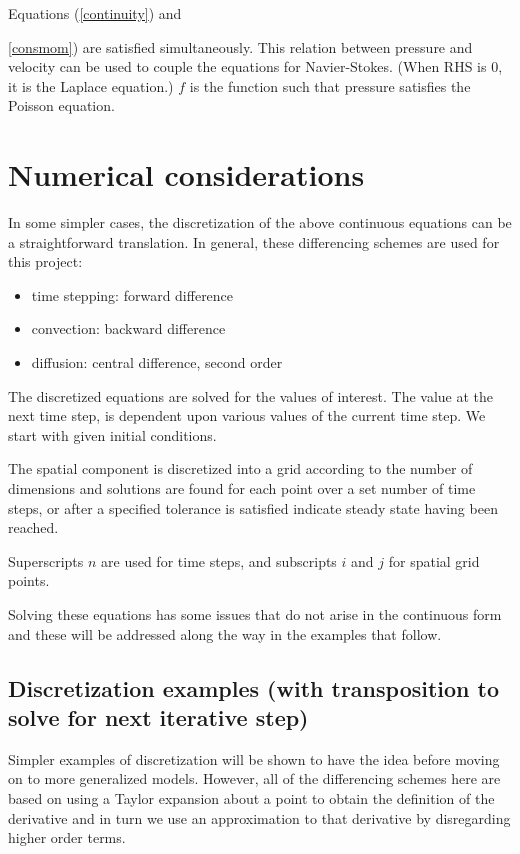 \documentclass[11pt]{article}
\begin{document}
Equations (\ref{continuity}) and {\ref{consmom}) are satisfied simultaneously.
This relation between pressure and velocity can be used to couple the equations
for Navier-Stokes. (When RHS is 0, it is the Laplace equation.) $f$ is the
function such that pressure satisfies the Poisson equation.


\section{Numerical considerations}

In some simpler cases, the discretization of the above continuous equations can
be a straightforward translation. In general, these differencing schemes are used
for this project:

\begin{itemize}
\item time stepping: forward difference
\item convection: backward difference
\item diffusion: central difference, second order
\end{itemize}

The discretized equations are solved for the values of interest.
The value at the next time step, is dependent upon various values of the current
time step. We start with given initial conditions.

The spatial component is discretized into a grid according to the number of
dimensions and solutions are found for each point over a set number of time
steps, or after a specified tolerance is satisfied indicate steady state having
been reached.

Superscripts $n$ are used for time steps,
and subscripts $i$ and $j$ for spatial grid points.

Solving these equations has some issues that do not arise in the continuous form
and these will be addressed along the way in the examples that follow.

\subsection{Discretization examples (with transposition to solve for next iterative step)}
Simpler examples of discretization will be shown to have the idea before moving
on to more generalized models. However, all of the differencing schemes here are
based on using a Taylor expansion about a point to obtain the definition of the
derivative and in turn we use an approximation to that derivative by disregarding
higher order terms.

}
\end{document}
